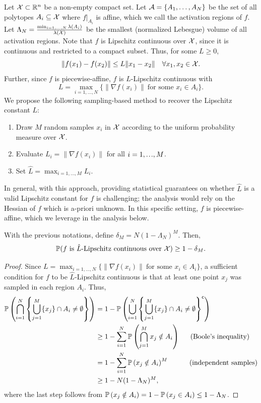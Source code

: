 \documentclass[12pt]{l4dc2022} %
\begin{document}
Let $\mathcal{X}\subset\mathbb{R}^n$ be a non-empty compact set. 
% 
Let $\mathcal{A}=\{A_1,\dots,A_N\}$ be the set of all polytopes $A_i\subseteq\mathcal{X}$ where $f|_{A_i}$ is affine, which we call the activation regions of $f$.  
Let $\Lambda_N=\frac{\min_{i=1,\dots,N} \lambda(A_i)}{\lambda(\mathcal{X})}$ be the smallest (normalized Lebesgue) volume of all activation regions. 
Note that $f$ is Lipschitz continuous over $\mathcal{X}$, since it is continuous and restricted to a compact subset. Thus, for some $L\geq 0$,
$$
\|f(x_1)-f(x_2)\|\leq L\|x_1-x_2\|\quad \forall x_1,x_2\in\mathcal{X}.
$$
Further, since  $f$ is piecewise-affine, $f$ is $L$-Lipschitz continuous with 
$$
L=\max_{i=1,\dots,N} \{\|\nabla f(x_i)\|\ \text{for some }x_i\in A_i\}.
$$
We propose the following sampling-based method to recover the Lipschitz constant $L$:
\begin{enumerate}\setlength\itemsep{0.5mm}
\item Draw $M$ random samples $x_i$ in $\mathcal{X}$ according to the uniform probability measure over $\mathcal{X}$.
\item Evaluate $L_i=\|\nabla f(x_i)\|$ for all $i=1,\mydots,M$.
\item Set $\hat{L}=\max_{i=1,\dots,M} L_i$.
\end{enumerate}
In general, with this approach, providing statistical guarantees on whether $\hat{L}$ is a valid Lipschitz constant for $f$ is challenging; the analysis would rely on the Hessian of $f$ which is a-priori unknown. 
% 
In this specific setting, $f$ is piecewise-affine, which we leverage in the analysis below.
\begin{lemma}
With the previous notations, define 
$\delta_M=N(1-\Lambda_N)^M
$. 
Then,
$$
\mathbb{P}(f\text{ is $\hat{L}$-Lipschitz continuous over $\mathcal{X}$})\geq 1-\delta_M.
$$
\end{lemma}
\begin{proof}
Since $L=\max_{i=1,\dots,N} \{\|\nabla f(x_i)\|\ \text{for some }x_i\in A_i\}$, a sufficient condition for $f$ to be $\hat{L}$-Lipschitz continuous is that at least one point $x_j$ was sampled in each region $A_i$. Thus,
\begin{align*}
\mathbb{P}\left(
\bigcap_{i=1}^N\left\{
\bigcup_{j=1}^M \{x_j\}\cap A_i\neq\emptyset
\right\}
\right)
&=
1-
\mathbb{P}\left(
\bigcup_{i=1}^N\left\{
\bigcup_{j=1}^M \{x_j\}\cap A_i\neq\emptyset
\right\}^{\mathsf{c}}
\right)
\\
&\geq
1-
\sum_{i=1}^N
\mathbb{P}\left(
\bigcap_{j=1}^M x_j\notin A_i
\right)
\ \,\quad\text{(Boole's inequality)}
\\
&=
1-
\sum_{i=1}^N
\mathbb{P}\left(
 x_j\notin A_i
\right)^M
\qquad\quad\text{(independent samples)}
\\
&\geq 
1-N(1-\Lambda_N)^M,
\end{align*}
where the last step follows from
$\mathbb{P}\left(
 x_j\notin A_i
\right)=1-\mathbb{P}\left(
 x_j\in A_i
\right)\leq 1-\Lambda_N$. 
\end{proof}
\end{document}
